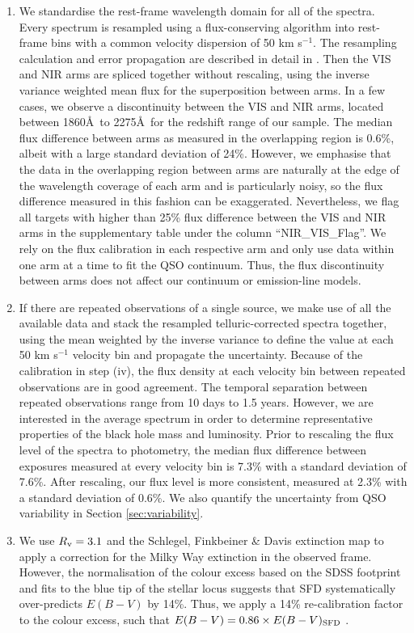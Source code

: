\documentclass[fleqn,usenatbib]{mnras}
\begin{document}
\begin{enumerate}
    \item We standardise the rest-frame wavelength domain for all of the spectra. Every spectrum is resampled using a flux-conserving algorithm \citep[\texttt{SPECTRES};][]{Carnall_2017} into rest-frame bins with a common velocity dispersion of 50 km s$^{-1}$. The resampling calculation and error propagation are described in detail in \citet{Carnall_2017}. Then the VIS and NIR arms are spliced together without rescaling, using the inverse variance weighted mean flux for the superposition between arms. In a few cases, we observe a discontinuity between the VIS and NIR arms, located between 1860\AA\ to 2275\AA\ for the redshift range of our sample. The median flux difference between arms as measured in the overlapping region is 0.6\%, albeit with a large standard deviation of 24\%. However, we emphasise that the data in the overlapping region between arms are naturally at the edge of the wavelength coverage of each arm and is particularly noisy, so the flux difference measured in this fashion can be exaggerated. Nevertheless, we flag all targets with higher than 25\% flux difference between the VIS and NIR arms in the supplementary table under the column ``NIR\_VIS\_Flag''. We rely on the flux calibration in each respective arm and only use data within one arm at a time to fit the QSO continuum. Thus, the flux discontinuity between arms does not affect our continuum or emission-line models.
    \item If there are repeated observations of a single source, we make use of all the available data and stack the resampled telluric-corrected spectra together, using the mean weighted by the inverse variance to define the value at each 50 km s$^{-1}$ velocity bin and propagate the uncertainty. Because of the calibration in step (iv), the flux density at each velocity bin between repeated observations are in good agreement. The temporal separation between repeated observations range from 10 days to 1.5 years. However, we are interested in the average spectrum in order to determine representative properties of the black hole mass and luminosity. Prior to rescaling the flux level of the spectra to photometry, the median flux difference between exposures measured at every velocity bin is 7.3\% with a standard deviation of 7.6\%. After rescaling, our flux level is more consistent, measured at 2.3\% with a standard deviation of 0.6\%. We also quantify the uncertainty from QSO variability in Section \ref{sec:variability}.
    \item We use $R_{\rm{v}} = 3.1$ and the Schlegel, Finkbeiner \& Davis \citep[SFD;][]{Schlegel_1998} extinction map to apply a correction for the Milky Way extinction in the observed frame. However, the normalisation of the colour excess based on the SDSS footprint and fits to the blue tip of the stellar locus suggests that SFD systematically over-predicts $E(B-V)$ by 14\%. \citep{Schlafly_2010} Thus, we apply a 14\% re-calibration factor to the colour excess, such that $E(B-V) = 0.86 \times E(B-V)_{\rm{SFD}}$ \citep{Schlafly_2011}.
    
\end{enumerate}
\end{document}
